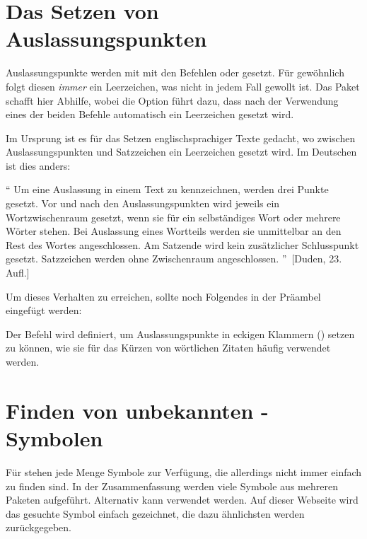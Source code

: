 \section{Das Setzen von Auslassungspunkten}
%
%
%
Auslassungspunkte werden mit  mit den Befehlen  oder 
 gesetzt. Für gewöhnlich folgt diesen \emph{immer} ein 
Leerzeichen, was nicht in jedem Fall gewollt ist. Das Paket  
schafft hier Abhilfe, wobei die Option  führt dazu, dass nach 
der Verwendung eines der beiden Befehle automatisch ein Leerzeichen gesetzt 
wird. 
%
\begin{quoting}
\begin{Code}
\usepackage[xspace]{ellipsis}
\end{Code}
\end{quoting}
%
Im Ursprung ist es für das Setzen englischsprachiger Texte gedacht, wo zwischen 
Auslassungspunkten und Satzzeichen ein Leerzeichen gesetzt wird. Im Deutschen 
ist dies anders:
%
\begin{quoting}
\enquote{%
  Um eine Auslassung in einem Text zu kennzeichnen, werden drei Punkte gesetzt. 
  Vor und nach den Auslassungspunkten wird jeweils ein Wortzwischenraum 
  gesetzt, wenn sie für ein selbständiges Wort oder mehrere Wörter stehen. Bei 
  Auslassung eines Wortteils werden sie unmittelbar an den Rest des Wortes 
  angeschlossen. Am Satzende wird kein zusätzlicher Schlusspunkt gesetzt. 
  Satzzeichen werden ohne Zwischenraum angeschlossen.%
}~[Duden, 23. Aufl.]
\end{quoting} 
%
Um dieses Verhalten zu erreichen, sollte noch Folgendes in der Präambel 
eingefügt werden:
%
\begin{quoting}
\begin{Code}
\let\ellipsispunctuation\relax
\newcommand*{\qdots}{[\dots{}]\xspace}
\end{Code}
\end{quoting}
%
Der Befehl  wird definiert, um Auslassungspunkte in eckigen 
Klammern (\POParameter{\dots}) setzen zu können, wie sie für das Kürzen von 
wörtlichen Zitaten häufig verwendet werden.



\section{Finden von unbekannten -Symbolen}
%
%
Für  stehen jede Menge Symbole zur Verfügung, die allerdings 
nicht immer einfach zu finden sind. In der Zusammenfassung
werden viele Symbole aus mehreren Paketen aufgeführt. Alternativ kann 
 verwendet werden. 
Auf dieser Webseite wird das gesuchte Symbol einfach gezeichnet, die dazu 
ähnlichsten werden zurückgegeben.



